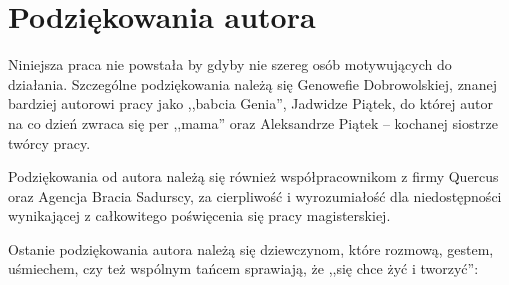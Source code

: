 \chapter{Podziękowania autora}
\label{cha:dodatekB}

Niniejsza praca nie powstała by gdyby nie szereg osób motywujących do działania. Szczególne podziękowania należą się Genowefie Dobrowolskiej, znanej bardziej autorowi pracy jako ,,babcia Genia'', Jadwidze Piątek, do której autor na co dzień zwraca się per ,,mama'' oraz Aleksandrze Piątek -- kochanej siostrze twórcy pracy.

Podziękowania od autora należą się również współpracownikom z firmy Quercus oraz Agencja Bracia Sadurscy, za cierpliwość i wyrozumiałość dla niedostępności wynikającej z całkowitego poświęcenia się pracy magisterskiej.

Ostanie podziękowania autora należą się dziewczynom, które rozmową, gestem, uśmiechem, czy też wspólnym tańcem sprawiają, że ,,się chce żyć i tworzyć'':

